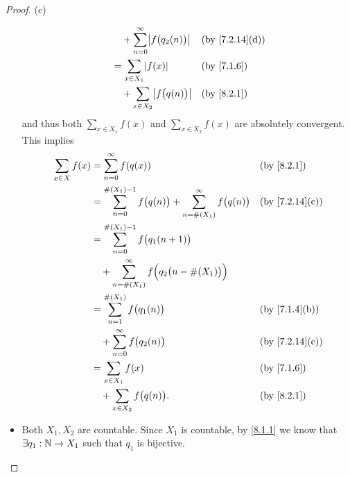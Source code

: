 \begin{proof}{(c)}
\begin{itemize}
\begin{align*}
			                                & \quad + \sum_{n = 0}^\infty \abs{f\big(q_2(n)\big)}                                                  &  & \text{(by \cref{7.2.14}(d))} \\
			                                & = \sum_{x \in X_1} \abs{f(x)}                                                                        &  & \by{7.1.6}                   \\
			                                & \quad + \sum_{x \in X_2} \abs{f\big(q(n)\big)}                                                       &  & \by{8.2.1}
		      \end{align*}
		      and thus both \(\sum_{x \in X_1} f(x)\) and \(\sum_{x \in X_2} f(x)\) are absolutely convergent.
		      This implies
		      \begin{align*}
			      \sum_{x \in X} f(x) & = \sum_{n = 0}^\infty f(q(x))                                                            &  & \by{8.2.1}                   \\
			                          & = \sum_{n = 0}^{\#(X_1) - 1} f\big(q(n)\big) + \sum_{n = \#(X_1)}^\infty f\big(q(n)\big) &  & \text{(by \cref{7.2.14}(c))} \\
			                          & = \sum_{n = 0}^{\#(X_1) - 1} f\big(q_1(n + 1)\big)                                                                         \\
			                          & \quad + \sum_{n = \#(X_1)}^\infty f\Big(q_2\big(n - \#(X_1)\big)\Big)                                                      \\
			                          & = \sum_{n = 1}^{\#(X_1)} f\big(q_1(n)\big)                                               &  & \text{(by \cref{7.1.4}(b))}  \\
			                          & \quad + \sum_{n = 0}^\infty f\big(q_2(n)\big)                                            &  & \text{(by \cref{7.2.14}(c))} \\
			                          & = \sum_{x \in X_1} f(x)                                                                  &  & \by{7.1.6}                   \\
			                          & \quad + \sum_{x \in X_2} f\big(q(n)\big).                                                &  & \by{8.2.1}
		      \end{align*}
		\item Both \(X_1, X_2\) are countable.
		      Since \(X_1\) is countable, by \cref{8.1.1} we know that \(\exists q_1 : \mathbb{N} \to X_1\) such that \(q_1\) is bijective.

\end{itemize}
\end{proof}
